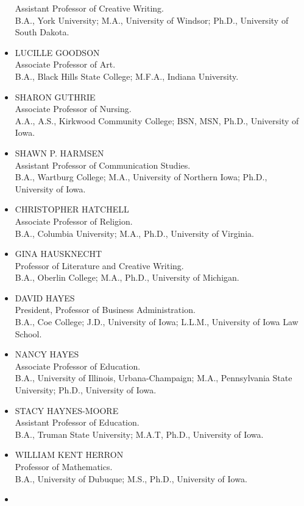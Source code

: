 \documentclass[
  letterpaper,
]{scrbook}
\begin{document}
\begin{itemize}
  Assistant Professor of Creative Writing.\\
  B.A., York University; M.A., University of Windsor; Ph.D., University
  of South Dakota.
\item
  LUCILLE GOODSON\\
  Associate Professor of Art.\\
  B.A., Black Hills State College; M.F.A., Indiana University.
\item
  SHARON GUTHRIE\\
  Associate Professor of Nursing.\\
  A.A., A.S., Kirkwood Community College; BSN, MSN, Ph.D., University of
  Iowa.
\item
  SHAWN P. HARMSEN\\
  Assistant Professor of Communication Studies.\\
  B.A., Wartburg College; M.A., University of Northern Iowa; Ph.D.,
  University of Iowa.
\item
  CHRISTOPHER HATCHELL\\
  Associate Professor of Religion.\\
  B.A., Columbia University; M.A., Ph.D., University of Virginia.
\item
  GINA HAUSKNECHT\\
  Professor of Literature and Creative Writing.\\
  B.A., Oberlin College; M.A., Ph.D., University of Michigan.
\item
  DAVID HAYES\\
  President, Professor of Business Administration.\\
  B.A., Coe College; J.D., University of Iowa; L.L.M., University of
  Iowa Law School.
\item
  NANCY HAYES\\
  Associate Professor of Education.\\
  B.A., University of Illinois, Urbana-Champaign; M.A., Pennsylvania
  State University; Ph.D., University of Iowa.
\item
  STACY HAYNES-MOORE\\
  Assistant Professor of Education.\\
  B.A., Truman State University; M.A.T, Ph.D., University of Iowa.
\item
  WILLIAM KENT HERRON\\
  Professor of Mathematics.\\
  B.A., University of Dubuque; M.S., Ph.D., University of Iowa.
\item

\end{itemize}
\end{document}
